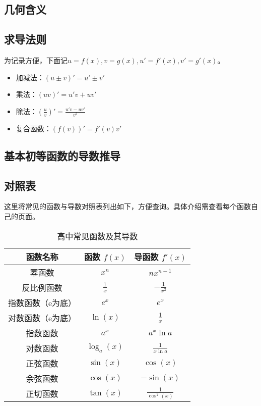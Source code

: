\subsection{几何含义}


\subsection{求导法则}

为记录方便，下面记$u=f(x),v=g(x),u'=f'(x),v'=g'(x)$。

\begin{itemize}
\item 加减法：$(u\pm v)'=u'\pm v'$
\item 乘法：$(uv)'=u'v+uv'$
\item 除法：$\displaystyle\left(\frac{u}{v}\right)'=\frac{u'v-uv'}{v^2}$
\item 复合函数：$(f(v))'=f'(v)v'$
\end{itemize}

\subsection{基本初等函数的导数推导}

\subsection{对照表}

这里将常见的函数与导数对照表列出如下，方便查询。具体介绍需查看每个函数自己的页面。

\begin{table}[ht]
\centering
\caption{高中常见函数及其导数}\label{tab_HsDerv1}
\begin{tabular}{|c|c|c|}
\hline
\textbf{函数名称}     & \textbf{函数 $f(x)$}     & \textbf{导函数 $f'(x)$}     \\ \hline
幂函数&$x^n$                    & $n x^{n-1}$                \\ \hline
反比例函数&$\displaystyle\frac{1}{x}$             & $\displaystyle-\frac{1}{x^2}$           \\ \hline
指数函数（e为底）&$e^x$                     & $e^x$                      \\ \hline
对数函数（e为底）&$\ln(x)$                  & $\displaystyle\frac{1}{x}$              \\ \hline
指数函数&$a^x$                     & $a^x\ln a $                      \\ \hline
对数函数&$\log_a(x)$                  & $\displaystyle \frac{1}{x\ln a}$              \\ \hline
正弦函数&$\sin(x)$                 & $\cos(x)$                  \\ \hline
余弦函数&$\cos(x)$                 & $-\sin(x)$                 \\ \hline
正切函数&$\tan(x)$                 & $\displaystyle \frac{1}{\cos^2(x)}$                \\ \hline
\end{tabular}
\end{table}


